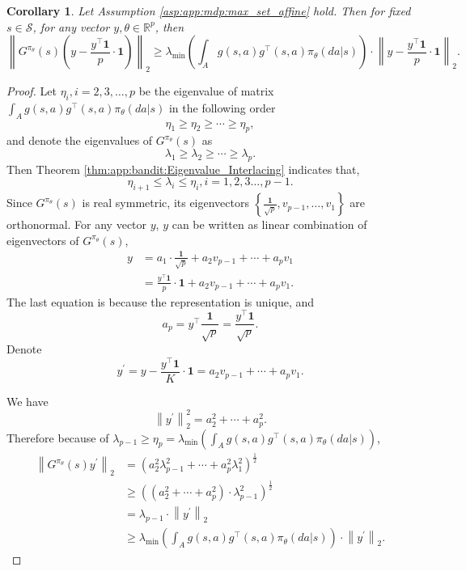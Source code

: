 \documentclass{amsart}
\newtheorem{corollary}{Corollary}
\theoremstyle{definition}
\begin{document}
\begin{corollary}\label{cor:app:mdp:spectrum_of_fim}
Let Assumption \ref{asp:app:mdp:max_set_affine} hold. Then for fixed $s \in \mathcal{S}$, for any vector $y, \theta \in \mathbb{R}^p$, then 
\[
{\left\|G^{\pi_\theta}(s)\left(y-\frac{y^{\top} \mathbf{1}}{p} \cdot \mathbf{1}\right)\right\|_2 \geq \lambda_{\min}\left(\int_{A} g(s,a)g^\top(s, a)\pi_\theta(da|s)\right)\cdot\left\|y-\frac{y^{\top} \mathbf{1}}{p} \cdot \mathbf{1}\right\|_2} .
\]
\end{corollary}
\begin{proof}
Let $\eta_i, i=2,3, \ldots, p$ be the eigenvalue of matrix $\int_{A} g(s,a)g^\top(s, a)\pi_\theta(da|s)$ in the following order
\[
\eta_1 \geq \eta_2 \geq \cdots \geq \eta_p,
\]
and denote the eigenvalues of $G^{\pi_\theta}(s)$ as
\[
\lambda_1 \geq \lambda_2 \geq \cdots \geq \lambda_p .
\]
Then Theorem \ref{thm:app:bandit:Eigenvalue_Interlacing} indicates that,
\[
\eta_{i+1} \leq \lambda_{i} \leq  \eta_i, i=1,2,3 \ldots, p - 1.
\]
Since $G^{\pi_\theta}(s)$ is real symmetric, its eigenvectors $\left\{\frac{\mathbf 1}{\sqrt{p}}, v_{p-1}, \ldots, v_1\right\}$ are orthonormal. For any vector $y$, $y$ can be written as linear combination of eigenvectors of $G^{\pi_\theta}(s)$,
\[
\begin{aligned}
y & =a_1 \cdot \frac{\mathbf 1}{\sqrt{p}}+a_{2}v_{p-1}+\cdots+a_p v_1 \\
& =\frac{y^{\top} \mathbf{1}}{p} \cdot \mathbf{1}+a_2 v_{p-1}+\cdots+a_p v_1.
\end{aligned}
\]
The last equation is because the representation is unique, and
\[
a_p=y^{\top} \frac{\mathbf{1}}{\sqrt{p}}=\frac{y^{\top} \mathbf{1}}{\sqrt{p}}.
\]
Denote
\[
y^{\prime}=y-\frac{y^{\top} \mathbf{1}}{K} \cdot \mathbf{1}=a_{2} v_{p-1}+\cdots+a_p v_1.
\]

We have
\[
\left\|y^{\prime}\right\|_2^2=a_2^2+\cdots+a_{p}^2.
\]
Therefore because of $\lambda_{p-1}\geq \eta_{p}= \lambda_{\min}\left(\int_{A} g(s,a)g^\top(s,a)\pi_\theta(da|s)\right)$,
\[
\begin{aligned}
\left\|G^{\pi_\theta}(s) y^{\prime}\right\|_2 & =\left(a_{2}^2 \lambda_{p-1}^2+\cdots+a_p^2 \lambda_1^2\right)^{\frac{1}{2}} \\
& \geq\left(\left(a_2^2+\cdots+a_{p}^2\right) \cdot \lambda_{p-1}^2\right)^{\frac{1}{2}} \\
& =\lambda_{p-1}\cdot\left\|y^{\prime}\right\|_2 \\
& \geq \lambda_{\min}\left(\int_{A} g(s,a)g^\top(s,a)\pi_\theta(da|s)\right) \cdot\left\|y^{\prime}\right\|_2 .
\end{aligned}
\]
\end{proof}
\end{document}
